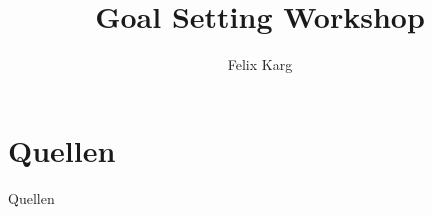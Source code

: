 \usepackage[ngerman, english]{babel}


\title{Goal Setting Workshop}
\author{Felix Karg}


\graphicspath{ {./img/} {../template/} {../template_tex/} } %

\newif\iftwocols
\twocolstrue





\newif\ifonline
\onlinefalse




% 
% 
% 





\section{Quellen}
\begin{frame}{Quellen}
% 


\end{frame}





